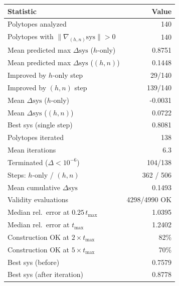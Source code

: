 \begin{tabular}{lr}
\toprule
Statistic & Value \\
\midrule
Polytopes analyzed & 140 \\
Polytopes with $\|\nabla_{(h,n)} \mathrm{sys}\| > 0$ & 140 \\
\midrule
Mean predicted max $\Delta\mathrm{sys}$ ($h$-only) & 0.8751 \\
Mean predicted max $\Delta\mathrm{sys}$ ($(h,n)$) & 0.1448 \\
\midrule
Improved by $h$-only step & 29/140 \\
Improved by $(h,n)$ step & 139/140 \\
Mean $\Delta\mathrm{sys}$ ($h$-only) & -0.0031 \\
Mean $\Delta\mathrm{sys}$ ($(h,n)$) & 0.0722 \\
Best sys (single step) & 0.8081 \\
\midrule
Polytopes iterated & 138 \\
Mean iterations & 6.3 \\
Terminated ($\Delta < 10^{-6}$) & 104/138 \\
Steps: $h$-only / $(h,n)$ & 362 / 506 \\
Mean cumulative $\Delta\mathrm{sys}$ & 0.1493 \\
\midrule
Validity evaluations & 4298/4990 OK \\
Median rel.\ error at $0.25\,t_{\max}$ & 1.0395 \\
Median rel.\ error at $t_{\max}$ & 1.2402 \\
Construction OK at $2\times t_{\max}$ & 82\% \\
Construction OK at $5\times t_{\max}$ & 70\% \\
\midrule
Best sys (before) & 0.7579 \\
Best sys (after iteration) & 0.8778 \\
\bottomrule
\end{tabular}
